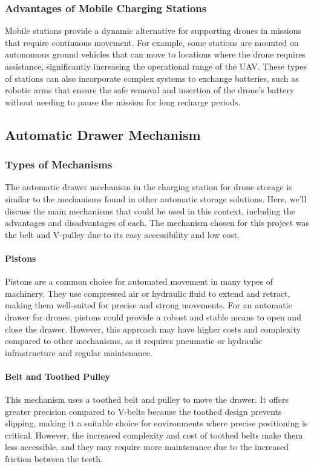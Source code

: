     \subsubsection{Advantages of Mobile Charging Stations}
    Mobile stations provide a dynamic alternative for supporting drones in missions that require continuous movement. For example, some stations are mounted on autonomous ground vehicles that can move to locations where the drone requires assistance, significantly increasing the operational range of the UAV. These types of stations can also incorporate complex systems to exchange batteries, such as robotic arms that ensure the safe removal and insertion of the drone's battery without needing to pause the mission for long recharge periods.

\subsection{Automatic Drawer Mechanism}
    \subsubsection{Types of Mechanisms}
    The automatic drawer mechanism in the charging station for drone storage is similar to the mechanisms found in other automatic storage solutions. Here, we'll discuss the main mechanisms that could be used in this context, including the advantages and disadvantages of each. The mechanism chosen for this project was the belt and V-pulley due to its easy accessibility and low cost.
    
    \paragraph{Pistons} Pistons are a common choice for automated movement in many types of machinery. They use compressed air or hydraulic fluid to extend and retract, making them well-suited for precise and strong movements. For an automatic drawer for drones, pistons could provide a robust and stable means to open and close the drawer. However, this approach may have higher costs and complexity compared to other mechanisms, as it requires pneumatic or hydraulic infrastructure and regular maintenance.
    
    \paragraph{Belt and Toothed Pulley} This mechanism uses a toothed belt and pulley to move the drawer. It offers greater precision compared to V-belts because the toothed design prevents slipping, making it a suitable choice for environments where precise positioning is critical. However, the increased complexity and cost of toothed belts make them less accessible, and they may require more maintenance due to the increased friction between the teeth.
    

